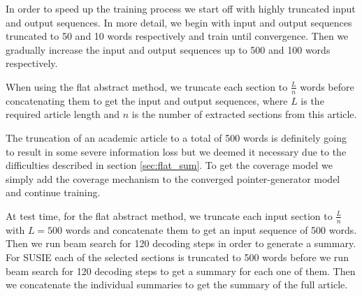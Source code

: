 \documentclass[runningheads]{llncs}
\begin{document}



In order to speed up the training process we start off with highly truncated input and output sequences. In more detail, we begin with input and output sequences truncated to 50 and 10 words respectively and train until convergence. Then we gradually increase the input and output sequences up to 500 and 100 words respectively.

When using the flat abstract method, we truncate each section to $\frac{L}{n}$ words before concatenating them to get the input and output sequences, where $L$ is the required article length and $n$ is the number of extracted sections from this article. 

The truncation of an academic article to a total of 500 words is definitely going to result in some severe information loss but we deemed it necessary due to the difficulties described in section \ref{sec:flat_sum}. To get the coverage model we simply add the coverage mechanism to the converged pointer-generator model and continue training.



At test time, for the flat abstract method, we truncate each input section to $\frac{L}{n}$ with $L=500$ words and concatenate them to get an input sequence of 500 words. Then we run beam search for 120 decoding steps in order to generate a summary. For SUSIE each of the selected sections is truncated to 500 words before we run beam search for 120 decoding steps to get a summary for each one of them. Then we concatenate the individual summaries to get the summary of the full article.
\end{document}
